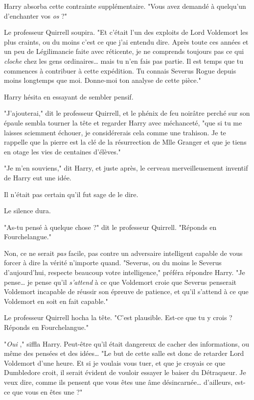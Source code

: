 Harry absorba cette contrainte supplémentaire. "Vous avez demandé à quelqu'un d'enchanter vos \emph{os}  ?"

Le professeur Quirrell soupira. "Et c'était l'un des exploits de Lord Voldemort les plus craints, ou du moins c'est ce que j'ai entendu dire. Après toute ces années et un peu de Légilimancie faite avec réticente, je ne comprends toujours pas ce qui \emph{cloche}  chez les gens ordinaires… mais tu n'en fais pas partie. Il est temps que tu commences à contribuer à cette expédition. Tu connais Severus Rogue depuis moins longtemps que moi. Donne-moi ton analyse de cette pièce."

Harry hésita en essayant de sembler pensif.

"J'ajouterai," dit le professeur Quirrell, et le phénix de feu noirâtre perché sur son épaule sembla tourner la tête et regarder Harry avec méchanceté, "que si tu me laisses sciemment échouer, je considérerais cela comme une trahison. Je te rappelle que la pierre est la clé de la résurrection de Mlle Granger et que je tiens en otage les vies de centaines d'élèves."

"Je m'en souviens," dit Harry, et juste après, le cerveau merveilleusement inventif de Harry eut une idée.

Il n'était pas certain qu'il fut sage de le dire.

Le silence dura.

"As-tu pensé à quelque chose ?" dit le professeur Quirrell. "Réponds en Fourchelangue."

Non, ce ne serait \emph{pas}  facile, pas contre un adversaire intelligent capable de vous forcer à dire la vérité n'importe quand. "Severus, ou du moins le Severus d'aujourd'hui, respecte beaucoup votre intelligence," préféra répondre Harry. "Je pense… je pense qu'il \emph{s'attend}  à ce que Voldemort croie que Severus penserait Voldemort incapable de réussir son épreuve de patience, et qu'il s'attend à ce que Voldemort en soit en fait capable."

Le professeur Quirrell hocha la tête. "C'est plausible. Est-ce que tu y crois ? Réponds en Fourchelangue."

"\emph{Oui} ," siffla Harry. Peut-être qu'il était dangereux de cacher des informations, ou même des pensées et des idées… "Le but de cette salle est donc de retarder Lord Voldemort d'une heure. Et si je voulais vous tuer, et que je croyais ce que Dumbledore croit, il serait évident de vouloir essayer le baiser du Détraqueur. Je veux dire, comme ils pensent que vous êtes une âme désincarnée… d'ailleurs, est-ce que vous en êtes une ?"

